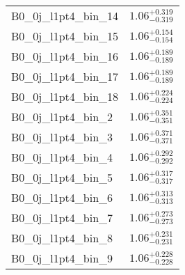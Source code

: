 \begin{tabular}{|l|c|}
B0\_0j\_l1pt4\_bin\_14 & $1.06^{+0.319}_{-0.319}$ \\
B0\_0j\_l1pt4\_bin\_15 & $1.06^{+0.154}_{-0.154}$ \\
B0\_0j\_l1pt4\_bin\_16 & $1.06^{+0.189}_{-0.189}$ \\
B0\_0j\_l1pt4\_bin\_17 & $1.06^{+0.189}_{-0.189}$ \\
B0\_0j\_l1pt4\_bin\_18 & $1.06^{+0.224}_{-0.224}$ \\
B0\_0j\_l1pt4\_bin\_2 & $1.06^{+0.351}_{-0.351}$ \\
B0\_0j\_l1pt4\_bin\_3 & $1.06^{+0.371}_{-0.371}$ \\
B0\_0j\_l1pt4\_bin\_4 & $1.06^{+0.292}_{-0.292}$ \\
B0\_0j\_l1pt4\_bin\_5 & $1.06^{+0.317}_{-0.317}$ \\
B0\_0j\_l1pt4\_bin\_6 & $1.06^{+0.313}_{-0.313}$ \\
B0\_0j\_l1pt4\_bin\_7 & $1.06^{+0.273}_{-0.273}$ \\
B0\_0j\_l1pt4\_bin\_8 & $1.06^{+0.231}_{-0.231}$ \\
B0\_0j\_l1pt4\_bin\_9 & $1.06^{+0.228}_{-0.228}$ \\
\hline
\end{tabular}
